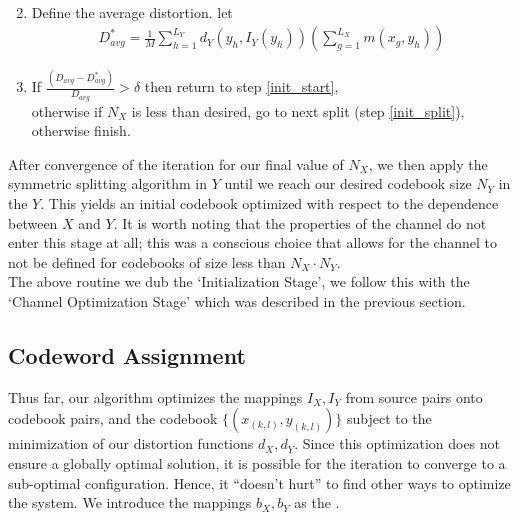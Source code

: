 \documentclass[10pt]{article}
\begin{document}
\begin{enumerate}
\begin{align}
    \end{align}
    \item Define the average distortion. let
    \begin{align}
        D_{avg}^* = \frac{1}{M}\sum_{h=1}^{L_Y}d_Y(y_h, I_Y(y_h))\left(\sum_{g=1}^{L_X}m(x_g,y_h)\right)
    \end{align}
    \item If
        $\frac
        {(D_{avg} - D^*_{avg})}
        {D_{avg}}
        > \delta$
        then return to step \ref{init_start},\\
        otherwise if $N_X$ is less than desired, go to next split (step \ref{init_split}),\\
        otherwise finish.
\end{enumerate}

After convergence of the iteration for our final value of $N_X$, we then apply the symmetric splitting algorithm in $Y$ until we reach our desired codebook size $N_Y$ in the $Y$. This yields an initial codebook optimized with respect to the dependence between $X$ and $Y$. It is worth noting that the properties of the channel do not enter this stage at all; this was a conscious choice that allows for the channel to not be defined for codebooks of size less than $N_X\cdot N_Y$.\\

The above routine we dub the `Initialization Stage', we follow this with the `Channel Optimization Stage' which was described in the previous section.



\subsection{Codeword Assignment}

Thus far, our algorithm optimizes the mappings $I_X, I_Y$ from source pairs onto codebook pairs, and the codebook $\{(x_{(k,l)}, y_{(k,l)})\}$ subject to the minimization of our distortion functions $d_X, d_Y$. Since this optimization does not ensure a globally optimal solution, it is possible for the iteration to converge to a sub-optimal configuration. Hence, it ``doesn't hurt'' to find other ways to optimize the system. We introduce the mappings $b_X, b_Y$ as the .\\
\end{document}
